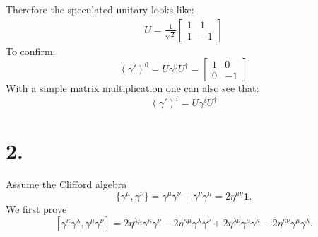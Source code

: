\documentclass{article}
\begin{document}
Therefore the speculated unitary looks like:
\begin{equation}
    \begin{split}
        U=\frac{1}{\sqrt{2}}\begin{bmatrix}
            1 & 1 \\ 1 & -1
        \end{bmatrix}
    \end{split}
\end{equation}
To confirm:
\begin{equation}
    (\gamma')^0=U\gamma^0U^\dagger=\begin{bmatrix}
            1 & 0 \\ 0 & -1
        \end{bmatrix}
\end{equation}
With a simple matrix multiplication one can also see that:
$$
(\gamma')^i = U\gamma^iU^\dagger
$$

\section*{2.}

Assume the Clifford algebra
\begin{equation}
    \{\gamma^\mu,\gamma^\nu\}
    =
    \gamma^\mu\gamma^\nu+\gamma^\nu\gamma^\mu
    =
    2\eta^{\mu\nu}\mathbf 1 .
\end{equation}
We first prove
\begin{equation}
    \left[\gamma^\kappa\gamma^\lambda,\gamma^\mu\gamma^\nu\right]
    =
    2\eta^{\lambda\mu}\gamma^\kappa\gamma^\nu
    -
    2\eta^{\kappa\mu}\gamma^\lambda\gamma^\nu
    +
    2\eta^{\lambda\nu}\gamma^\mu\gamma^\kappa
    -
    2\eta^{\kappa\nu}\gamma^\mu\gamma^\lambda .
\end{equation}
\end{document}

